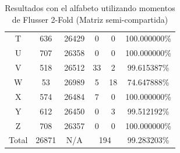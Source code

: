 \documentclass[a4paper, 11pt, oneside]{report}
\begin{document}
\begin{table}
\begin{tabular}{|c|c|c|c|c|c|}
T & 636 & 26429 & 0 & 0 & 100.000000\% \\ 
U & 707 & 26358 & 0 & 0 & 100.000000\% \\ 
V & 518 & 26512 & 33 & 2 & 99.615387\% \\ 
W & 53 & 26989 & 5 & 18 & 74.647888\% \\ 
X & 574 & 26484 & 7 & 0 & 100.000000\% \\ 
Y & 612 & 26450 & 0 & 3 & 99.512192\% \\ 
Z & 708 & 26357 & 0 & 0 & 100.000000\% \\ 
\hline
Total & 26871 & N/A & \multicolumn{2}{|c|}{194} & 99.283203\% \\
\hline
\end{tabular}
\caption{Resultados con el alfabeto utilizando momentos de Flusser 2-Fold (Matriz semi-compartida)}
\label{tb:alphaRotShared}
\end{table}
\end{document}
